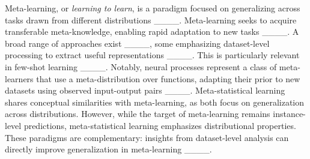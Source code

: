 Meta-learning, or \textit{learning to learn}, is a paradigm focused on generalizing across tasks drawn from different distributions ____. Meta-learning seeks to acquire transferable meta-knowledge, enabling rapid adaptation to new tasks ____. A broad range of approaches exist ____, some emphasizing dataset-level processing to extract useful representations ____. This is particularly relevant in few-shot learning ____. 
Notably, neural processes represent a class of meta-learners that use a meta-distribution over functions, adapting their prior to new datasets using observed input-output pairs ____.
% 
Meta-statistical learning shares conceptual similarities with meta-learning, as both focus on generalization across distributions. However, while the target of meta-learning remains instance-level predictions, meta-statistical learning emphasizes distributional properties. These paradigms are complementary: insights from dataset-level analysis can directly improve generalization in meta-learning ____.